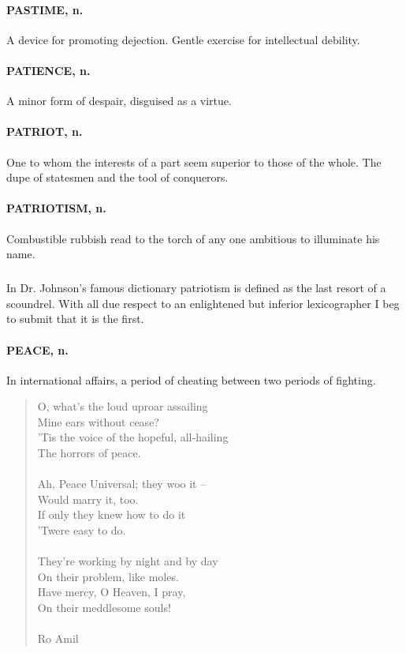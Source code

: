 \documentclass[11pt]{article}
\begin{document}
\paragraph{PASTIME, n.}  A device for promoting dejection.  Gentle exercise for
intellectual debility.

\paragraph{PATIENCE, n.}  A minor form of despair, disguised as a virtue.

\paragraph{PATRIOT, n.}  One to whom the interests of a part seem superior to
those of the whole.  The dupe of statesmen and the tool of conquerors.

\paragraph{PATRIOTISM, n.}  Combustible rubbish read to the torch of any one
ambitious to illuminate his name.
\subparagraph{}   In Dr. Johnson's famous dictionary patriotism is defined as the
last resort of a scoundrel.  With all due respect to an enlightened
but inferior lexicographer I beg to submit that it is the first.

\paragraph{PEACE, n.}  In international affairs, a period of cheating between two
periods of fighting.

\begin{quote}  O, what's the loud uproar assailing \\
       Mine ears without cease? \\
  'Tis the voice of the hopeful, all-hailing \\
      The horrors of peace. \\
 \\
  Ah, Peace Universal; they woo it -- \\
      Would marry it, too. \\
  If only they knew how to do it \\
      'Twere easy to do. \\
 \\
  They're working by night and by day \\
      On their problem, like moles. \\
  Have mercy, O Heaven, I pray, \\
      On their meddlesome souls! \\
 \\
Ro Amil \end{quote}
\end{document}
